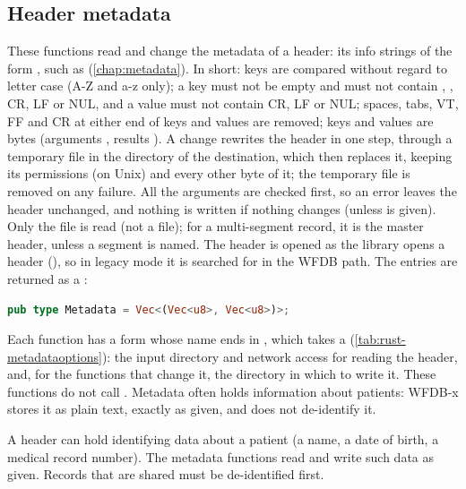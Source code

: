 \subsection{Header metadata}
\label{sec:rust-metadata}

These functions read and change the metadata of a header: its info strings of the form
, such as  (\cref{chap:metadata}). In short: keys are
compared without regard to letter case (A-Z and a-z only); a key must not be empty and
must not contain \code{:}, \code{\#}, CR, LF or NUL, and a value must not contain CR, LF
or NUL; spaces, tabs, VT, FF and CR at either end of keys and values are removed; keys and
values are bytes (arguments , results ). A change
rewrites the header in one step, through a temporary file in the directory of the
destination, which then replaces it, keeping its permissions (on Unix) and every other
byte of it; the temporary file is removed on any failure. All the arguments are checked
first, so an error leaves the header unchanged, and nothing is written if nothing changes
(unless  is given). Only the  file is read (not a 
file); for a multi-segment record, it is the master header, unless a segment is named.
The header is opened as the library opens a header (), so in legacy mode
it is searched for in the WFDB path. The entries are returned as a :
\begin{lstlisting}[language=Rust]
pub type Metadata = Vec<(Vec<u8>, Vec<u8>)>;
\end{lstlisting}
Each function has a form whose name ends in , which takes a
 (\cref{tab:rust-metadataoptions}): the input directory and network
access for reading the header, and, for the functions that change it, the directory
 in which to write it. These functions do not call . Metadata
often holds information about patients: WFDB-x stores it as plain text, exactly as given,
and does not de-identify it.

\begin{phibox}
A header can hold identifying data about a patient (a name, a date of birth, a medical
record number). The metadata functions read and write such data as given. Records that
are shared must be de-identified first.
\end{phibox}

